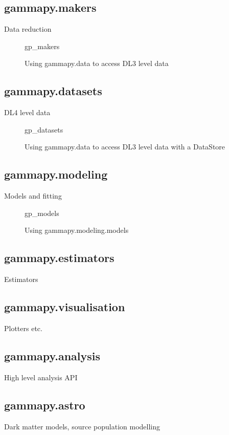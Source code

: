\subsection{gammapy.makers}
Data reduction

\begin{figure}
	{gp_makers}

	\caption{Using gammapy.data to access DL3 level data}
	\label{ig*:minted:gp_makers}
\end{figure}

\subsection{gammapy.datasets}
DL4 level data

\begin{figure}

	{gp_datasets}
	\caption{Using gammapy.data to access DL3 level data with a DataStore}
	\label{fig*:minted:gp_datasets}
\end{figure}

\subsection{gammapy.modeling}
Models and fitting

\begin{figure}
	{gp_models}
	\caption{Using gammapy.modeling.models}
	\label{fig*:minted:gp_models}
\end{figure}

\subsection{gammapy.estimators}
Estimators

\subsection{gammapy.visualisation}
Plotters etc.

\subsection{gammapy.analysis}
High level analysis API

\subsection{gammapy.astro}
Dark matter models, source population modelling

